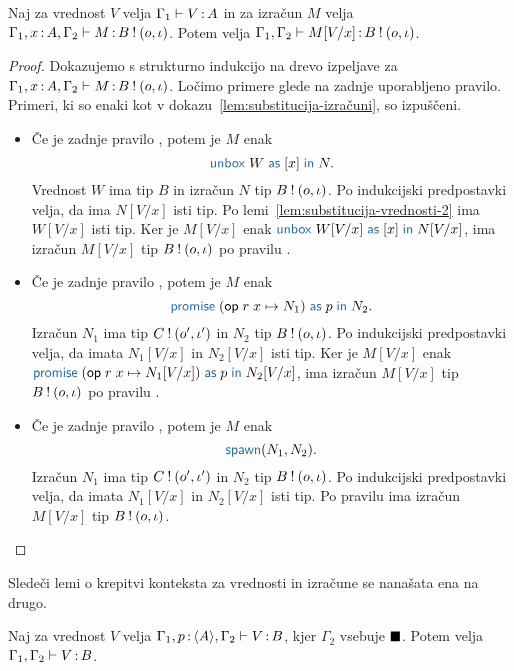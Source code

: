 \begin{lema}\label{lem:substitucija-izračuni-2}
	Naj za vrednost $V$ velja $\Gamma_1 \vdash V \mathinner{:} A$ in za izračun $M$ velja $\Gamma_1, x \mathinner{:} A, \Gamma_2 \vdash M \mathinner{:} B \mathbin{!} (o, \iota)$. Potem velja $\Gamma_1, \Gamma_2 \vdash M[V/x] \mathinner{:} B \mathbin{!} (o, \iota)$.
\end{lema}

\begin{proof}
	Dokazujemo s strukturno indukcijo na drevo izpeljave za $\Gamma_1, x \mathinner{:} A, \Gamma_2 \vdash M \mathinner{:} B \mathbin{!} (o, \iota)$.
	Ločimo primere glede na zadnje uporabljeno pravilo.
	Primeri, ki so enaki kot v dokazu~\ref{lem:substitucija-izračuni}, so izpuščeni.
	
	\begin{itemize}
		\item Če je zadnje pravilo , potem je $M$ enak $$\tmunbox{W}{x}{N}.$$ Vrednost $W$ ima tip $B$ in izračun $N$ tip $B \mathbin{!} (o, \iota)$.
		Po indukcijski predpostavki velja, da ima $N[V/x]$ isti tip. Po lemi~\ref{lem:substitucija-vrednosti-2} ima $W[V/x]$ isti tip. Ker je $M[V/x]$ enak $\tmunbox{W[V/x]}{x}{N[V/x]}$, ima izračun $M[V/x]$ tip $B \mathbin{!} (o, \iota)$ po pravilu .
		
		\item Če je zadnje pravilo , potem je $M$ enak $$\tmwithrec{op}{r}{x}{N_1}{p}{N_2}.$$ Izračun $N_1$ ima tip $C \mathbin{!} (o', \iota')$ in $N_2$ tip $B \mathbin{!} (o, \iota)$.
		Po indukcijski predpostavki velja, da imata $N_1[V/x]$ in $N_2[V/x]$ isti tip. Ker je $M[V/x]$ enak $\tmwithrec{op}{r}{x}{N_1[V/x]}{p}{N_2[V/x]}$, ima izračun $M[V/x]$ tip $B \mathbin{!} (o, \iota)$ po pravilu .
		
		\item Če je zadnje pravilo , potem je $M$ enak $$\tmspawn{N_1}{N_2}.$$ Izračun $N_1$ ima tip $C \mathbin{!} (o', \iota')$ in $N_2$ tip $B \mathbin{!} (o, \iota)$.
		Po indukcijski predpostavki velja, da imata $N_1[V/x]$ in $N_2[V/x]$ isti tip. Po pravilu  ima izračun $M[V/x]$ tip $B \mathbin{!} (o, \iota)$.	
	\end{itemize}
	
\end{proof}

Sledeči lemi o krepitvi konteksta za vrednosti in izračune se nanašata ena na drugo.

\begin{lema}\label{lem:strengthening-values-promise}
	Naj za vrednost $V$ velja $\Gamma_1, p \mathinner{:} \langle A \rangle, \Gamma_2 \vdash V \mathinner{:} B$, kjer $\Gamma_2$ vsebuje $\blacksquare$. Potem velja $\Gamma_1, \Gamma_2 \vdash V \mathinner{:} B$.
\end{lema}

